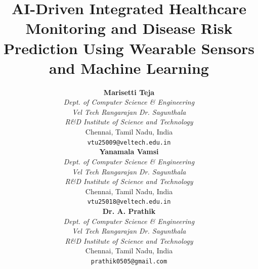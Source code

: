 \documentclass[conference]{IEEEtran}
\begin{document}
\title{AI-Driven Integrated Healthcare Monitoring and Disease Risk Prediction Using Wearable Sensors and Machine Learning}

\author{
  \begin{minipage}[t]{0.315\textwidth}\centering
    \textbf{Marisetti Teja} \\
    \textit{Dept. of Computer Science \& Engineering} \\
    \textit{Vel Tech Rangarajan Dr. Sagunthala} \\
    \textit{R\&D Institute of Science and Technology} \\
    Chennai, Tamil Nadu, India \\
    \texttt{vtu25009@veltech.edu.in}
  \end{minipage}\hfill
  \begin{minipage}[t]{0.315\textwidth}\centering
    \textbf{Yanamala Vamsi} \\
    \textit{Dept. of Computer Science \& Engineering} \\
    \textit{Vel Tech Rangarajan Dr. Sagunthala} \\
    \textit{R\&D Institute of Science and Technology} \\
    Chennai, Tamil Nadu, India \\
    \texttt{vtu25018@veltech.edu.in}
  \end{minipage}\hfill
  \begin{minipage}[t]{0.315\textwidth}\centering
    \textbf{Dr. A. Prathik} \\
    \textit{Dept. of Computer Science \& Engineering} \\
    \textit{Vel Tech Rangarajan Dr. Sagunthala} \\
    \textit{R\&D Institute of Science and Technology} \\
    Chennai, Tamil Nadu, India \\
    \texttt{prathik0505@gmail.com}
  \end{minipage}
}

\maketitle
\end{document}
